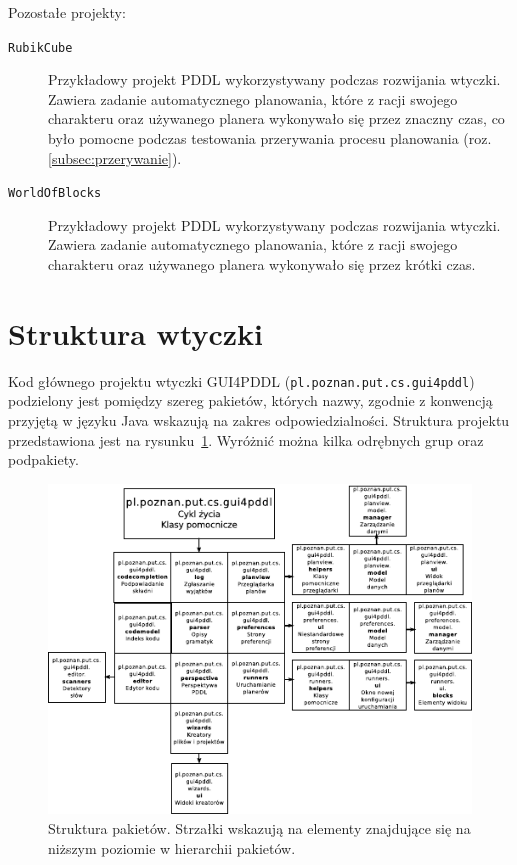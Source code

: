 Pozostałe projekty:
\begin{description}
\item [\texttt{RubikCube}] Przykładowy projekt PDDL wykorzystywany podczas rozwijania wtyczki. Zawiera zadanie automatycznego planowania, które z racji swojego charakteru oraz używanego planera wykonywało się przez znaczny czas, co było pomocne podczas testowania przerywania procesu planowania (roz. \ref{subsec:przerywanie}).
\item [\texttt{WorldOfBlocks}] Przykładowy projekt PDDL wykorzystywany podczas rozwijania wtyczki. Zawiera zadanie automatycznego planowania, które z racji swojego charakteru oraz używanego planera wykonywało się przez krótki czas.
\end{description}

\section{Struktura wtyczki}
\label{sec:struktura}

Kod głównego projektu wtyczki GUI4PDDL (\texttt{pl.poznan.put.cs.gui4pddl}) podzielony jest pomiędzy szereg pakietów, których nazwy, zgodnie z konwencją przyjętą w języku Java wskazują na zakres odpowiedzialności. Struktura projektu przedstawiona jest na rysunku~\ref{fig:packets_scheme}. Wyróżnić można kilka odrębnych grup oraz podpakiety.

\begin{figure}[h!]
    \centering
    \includegraphics[width=\textwidth]{img/packets_scheme}
    \caption{Struktura pakietów. Strzałki wskazują na elementy znajdujące się na niższym poziomie w hierarchii pakietów.}
    \label{fig:packets_scheme}
\end{figure}

